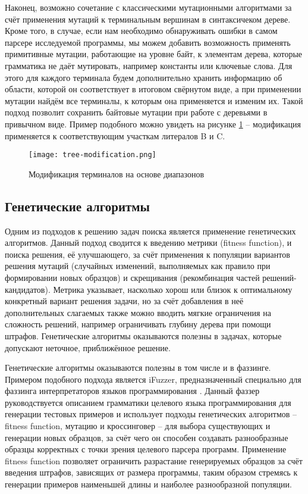 Наконец, возможно сочетание с классическими мутационными алгоритмами за счёт применения мутаций к терминальным вершинам в синтаксичеком дереве. Кроме того, в случае, если нам необходимо обнаруживать ошибки в самом парсере исследуемой программы, мы можем добавить возможность применять примитивные мутации, работающие на уровне байт, к элементам дерева, которые грамматика не даёт мутировать, например константы или ключевые слова. Для этого для каждого терминала будем дополнительно хранить информацию об области, которой он соответствует в итоговом свёрнутом виде, а при применении мутации найдём все терминалы, к которым она применяется и изменим их. Такой подход позволит сохранить байтовые мутации при работе с деревьями в привычном виде. Пример подобного можно увидеть на рисунке \ref{fig:tree_modification} -- модификация применяется к соответствующим участкам литералов B и C.

\begin{figure}[h]
	\centering
	\texttt{[image: tree-modification.png]}
	\caption{Модификация терминалов на основе диапазонов}
	\label{fig:tree_modification}
\end{figure}%

\subsection{Генетические алгоритмы}

Одним из подходов к решению задач поиска является применение генетических алгоритмов. Данный подход сводится к введению метрики (fitness function), и поиска решения, её улучшающего, за счёт применения к популяции вариантов решения мутаций (случайных изменений, выполняемых как правило при формировании новых образцов) и скрещивания (рекомбинация частей решений-кандидатов). Метрика указывает, насколько хорош или близок к оптимальному конкретный вариант решения задачи, но за счёт добавления в неё дополнительных слагаемых также можно вводить мягкие ограничения на сложность решений, например ограничивать глубину дерева при помощи штрафов. Генетические алгоритмы оказываются полезны в задачах, которые допускают неточное, приближённое решение.

Генетические алгоритмы оказываются полезны в том числе и в фаззинге. Примером подобного подхода является iFuzzer, предназначенный специально для фаззинга интерпретаторов языков программирования \cite{ifuzzer}. Данный фаззер руководствуется описанием грамматики целевого языка программирования для генерации тестовых примеров и использует подходы генетических алгоритмов -- fitness function, мутацию и кроссинговер -- для выбора существующих и генерации новых образцов, за счёт чего он способен создавать разнообразные образцы корректных с точки зрения целевого парсера программ. Применение fitness function позволяет ограничить разрастание генерируемых образцов за счёт введения штрафов, зависящих от размера программы, таким образом стремясь к генерации примеров наименьшей длины и наиболее разнообразной популяции.

